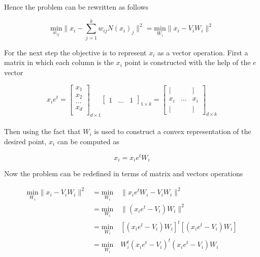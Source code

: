 \documentclass[12pt,journal]{IEEEtran}
\begin{document}
    Hence the problem can be rewritten as follows

    \begin{equation*}
            \underset{w_{ij}}{\text{min}} \lVert x_i - \sum_{j=1}^k w_{ij} N(x_i)_j \rVert^2
            =
            \underset{W_i}{\text{min}} \lVert x_i - V_i W_i \rVert^2
    \end{equation*}

    For the next step the objective is to represent $x_i$ as a vector operation.
    First a matrix in which each column is the $x_i$ point is constructed with
    the help of the $e$ vector

    \[
        x_i e^t =
        \begin{bmatrix}
            x_1 \\
            x_2 \\
            \dots \\
            x_d \\
        \end{bmatrix}_{d \times 1}
        \begin{bmatrix}
            1 & \dots & 1
        \end{bmatrix}_{1 \times k}
        =
        \begin{bmatrix}
            |   &       & | \\
            x_i & \dots & x_i\\
            |   &       & |
        \end{bmatrix}_{d \times k}
    \]\\

    Then using the fact that $W_i$ is used to construct a convex representation
    of the desired point, $x_i$ can be computed as

    \begin{equation*}
        x_i = x_i e^t W_i
    \end{equation*}

    Now the problem can be redefined in terms of matrix and vectors operations

    \begin{equation*}
        \begin{aligned}
            \underset{W_i}{\text{min}} \lVert x_i - V_i W_i \rVert^2
            &=
            \underset{W_i}{\text{min}} \quad \lVert x_i e^t W_i - V_i W_i \rVert^2\\
            &=
            \underset{W_i}{\text{min}} \quad \lVert (x_i e^t - V_i) W_i \rVert^2\\
            &=
            \underset{W_i}{\text{min}} \quad [(x_i e^t - V_i) W_i]^t [(x_i e^t - V_i) W_i]\\
            &=
            \underset{W_i}{\text{min}} \quad W_i^t(x_i e^t - V_i)^t (x_i e^t - V_i) W_i\\
        \end{aligned}
    \end{equation*}
\end{document}
